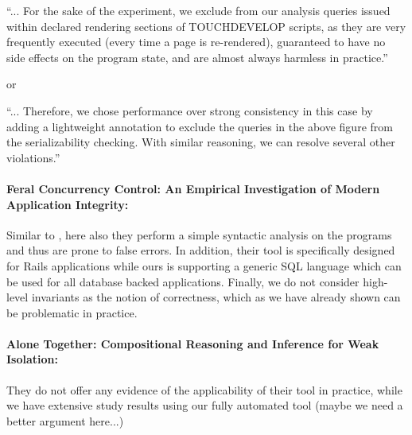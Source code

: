 \documentclass[12pt,letter]{article}
\begin{document}
\begin{displayquote}
``... For the sake of the experiment, we exclude from our analysis queries issued
within declared rendering sections of TOUCHDEVELOP scripts, as they are
very frequently executed (every time a page is re-rendered), guaranteed to
have no side effects on the program state, and are almost always harmless
in practice.''
\end{displayquote}
or 
\begin{displayquote}
``...  Therefore, we chose performance over strong consistency in this case by
  adding a lightweight annotation to exclude the queries in the above
  figure from the serializability checking. With similar reasoning, we can
  resolve several other violations.''
\end{displayquote}

\paragraph{Feral Concurrency Control:
An Empirical Investigation of Modern Application
Integrity\cite{Bailis:Feral}:} 
Similar to \cite{Bailis:Acid}, here also they perform a simple syntactic
analysis on the programs and thus are prone to false errors. In addition,
their tool is specifically designed for Rails applications while ours is
supporting a generic SQL language which can be used for all database backed
applications. Finally, we do not consider high-level invariants as the
notion of correctness, which as we have already shown can be problematic in
practice. 

\paragraph{Alone Together: Compositional Reasoning and Inference for Weak
Isolation\cite{Kaki:Alone}:}
They do not offer any evidence of the applicability of their tool in
practice, while we have extensive study results using our fully automated
tool (maybe we need a
better argument here...)









\end{document}
